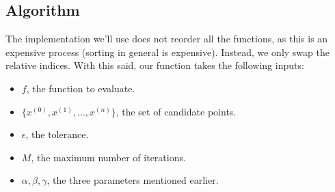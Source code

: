 \documentclass[letterpaper]{article}
\begin{document}
\subsection{Algorithm}
The implementation we'll use does not reorder all the functions, as this is an expensive process (sorting in general is expensive). Instead, we only swap the relative indices. With this said, our function takes the following inputs: 
\begin{itemize}
    \item $f$, the function to evaluate. 
    \item $\{x^{(0)}, x^{(1)}, \hdots, x^{(n)}\}$, the set of candidate points. 
    \item $\epsilon$, the tolerance. 
    \item $M$, the maximum number of iterations. 
    \item $\alpha, \beta, \gamma$, the three parameters mentioned earlier.
\end{itemize} 
\end{document}
